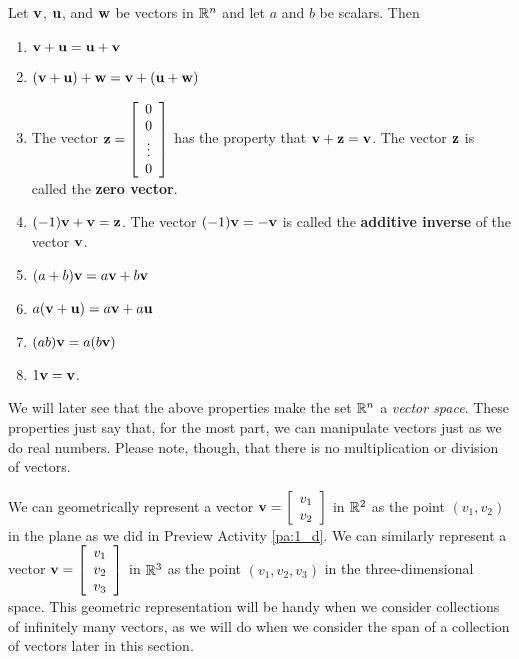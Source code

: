 \begin{theorem} \label{thm:vector_properties} Let $\mathbf{v}$, $\mathbf{u}$, and $\mathbf{w}$ be vectors in $\mathbb{R}^n$ and let $a$ and $b$ be scalars. Then
\begin{enumerate}
\item $\mathbf{v} + \mathbf{u} = \mathbf{u} + \mathbf{v}$
\item $(\mathbf{v} + \mathbf{u}) + \mathbf{w} = \mathbf{v} + (\mathbf{u} + \mathbf{w})$
\item The vector $\mathbf{z} = \left[ \begin{array}{c} 0 \\ 0 \\ \vdots \\ 0 \end{array} \right]$ has the property that $\mathbf{v} + \mathbf{z} = \mathbf{v}$. The vector $\mathbf{z}$ is called the \textbf{zero vector}.
\item  $(-1)\mathbf{v} + \mathbf{v} = \mathbf{z}$. The vector $(-1)\mathbf{v} = -\mathbf{v}$ is called the \textbf{additive inverse} of the vector $\mathbf{v}$.
\item $(a+b) \mathbf{v} = a\mathbf{v} + b\mathbf{v}$
\item $a(\mathbf{v} + \mathbf{u}) = a\mathbf{v} + a\mathbf{u}$
\item $(ab) \mathbf{v} = a(b\mathbf{v})$
\item $1 \mathbf{v} = \mathbf{v}$.
\end{enumerate}
\end{theorem}



We will later see that the above properties make the set $\mathbb{R}^n$ a \emph{vector space}. These properties just say that, for the most part, we can manipulate vectors just as we do real numbers. Please note, though, that there is no multiplication or division of vectors. 


We can geometrically represent a vector $\mathbf{v} = \left[ \begin{array}{c} v_1\\ v_2\end{array} \right] $ in $\mathbb{R}^2$ as the point $(v_1, v_2)$ in the plane as we did in Preview Activity \ref{pa:1_d}. We can similarly represent a vector $\mathbf{v} = \left[ \begin{array}{c} v_1\\ v_2\\ v_3 \end{array} \right]$ in $\mathbb{R}^3$ as the point $(v_1, v_2, v_3)$ in the three-dimensional space. This geometric representation will be handy when we consider collections of infinitely many vectors, as we will do when we consider the span of a collection of vectors later in this section.


